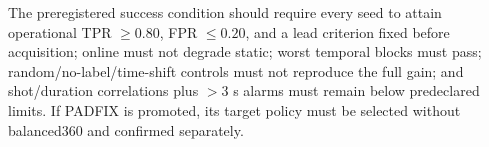 \documentclass[10pt]{article}
\begin{document}
The preregistered success condition should require every seed to attain operational TPR $\geq0.80$, FPR $\leq0.20$, and a lead criterion fixed before acquisition; online must not degrade static; worst temporal blocks must pass; random/no-label/time-shift controls must not reproduce the full gain; and shot/duration correlations plus $>3$ s alarms must remain below predeclared limits.  If PADFIX is promoted, its target policy must be selected without balanced360 and confirmed separately.



\end{document}
